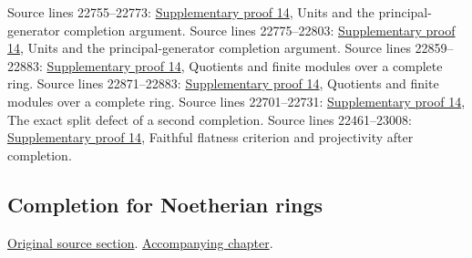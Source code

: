 \begin{AlgebraSourceRoutes}
 Source lines 22755--22773: \hyperlink{algebra_projectivity_completion_notes_20260927}{Supplementary proof 14}, Units and the principal-generator completion argument.
 Source lines 22775--22803: \hyperlink{algebra_projectivity_completion_notes_20260927}{Supplementary proof 14}, Units and the principal-generator completion argument.
 Source lines 22859--22883: \hyperlink{algebra_projectivity_completion_notes_20260927}{Supplementary proof 14}, Quotients and finite modules over a complete ring.
 Source lines 22871--22883: \hyperlink{algebra_projectivity_completion_notes_20260927}{Supplementary proof 14}, Quotients and finite modules over a complete ring.
 Source lines 22701--22731: \hyperlink{algebra_projectivity_completion_notes_20260927}{Supplementary proof 14}, The exact split defect of a second completion.
 Source lines 22461--23008: \hyperlink{algebra_projectivity_completion_notes_20260927}{Supplementary proof 14}, Faithful flatness criterion and projectivity after completion.
\end{AlgebraSourceRoutes}

\subsection{Completion for Noetherian rings}
\hypertarget{algebra-source-section-completion-noetherian}{}
\noindent\href{https://github.com/stacks/stacks-project/blob/a04446e57ec1fbc252a871afcec7752fb2807b14/algebra.tex\#L22893}{Original source section}. \href{algebra.pdf\#nameddest=section-completion-noetherian}{Accompanying chapter}.

